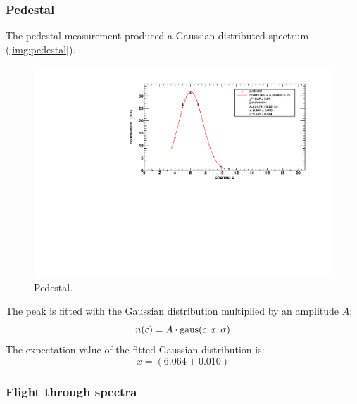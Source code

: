 \subsubsection{Pedestal}
The pedestal measurement produced a Gaussian distributed spectrum (\autoref{img:pedestal}).
\begin{figure}[H]
\begin{center}
  \includegraphics[width=\textwidth]{../img/pedestal.pdf}
  \caption{Pedestal.}
  \label{img:pedestal}
\end{center}
\end{figure}
The peak is fitted with the Gaussian distribution multiplied by an amplitude $A$:
\begin{equation}
    n(c) = A \cdot \operatorname{gaus}(c;x,\sigma)
\end{equation}
The expectation value of the fitted Gaussian distribution is:
\begin{equation}
    x = (6.064 \pm 0.010)
\end{equation}

\subsubsection{Flight through spectra}
